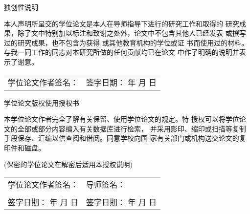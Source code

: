 \newpage


\begin{center}
    \Large 独创性说明
\end{center}
\vspace{1cm}

本人声明所呈交的学位论文是本人在导师指导下进行的研究工作和取得的
研究成果，除了文中特别加以标注和致谢之处外，论文中不包含其他人已经发表
或撰写过的研究成果，也不包含为获得 \tjudeclare 或其他教育机构的学位或证
书而使用过的材料。与我一同工作的同志对本研究所做的任何贡献均已在论文
中作了明确的说明并表示了谢意。

\vspace{1cm}


    
    

\begin{table}[h]
\begin{tabularx}{\textwidth}{XX}
学位论文作者签名： & 签字日期： \qquad\qquad  年  \qquad 月 \qquad 日 
\end{tabularx}
\end{table}



\vspace{3cm}


\begin{center}
    \Large 学位论文版权使用授权书
\end{center}
\vspace{2cm} 


本学位论文作者完全了解\tjudeclare 有关保留、使用学位论文的规定。特
授权\tjudeclare 可以将学位论文的全部或部分内容编入有关数据库进行检索，
并采用影印、缩印或扫描等复制手段保存、汇编以供查阅和借阅。同意学校向国
家有关部门或机构送交论文的复印件和磁盘。

(保密的学位论文在解密后适用本授权说明)

\vspace{2cm}

\begin{table}[h]
\begin{tabularx}{\textwidth}{XX}
学位论文作者签名：        & 导师签名：            \\
 & \\
签字日期：  \qquad\qquad  年  \qquad 月 \qquad 日 & 签字日期： \qquad\qquad  年  \qquad 月 \qquad 日 
\end{tabularx}
\end{table}